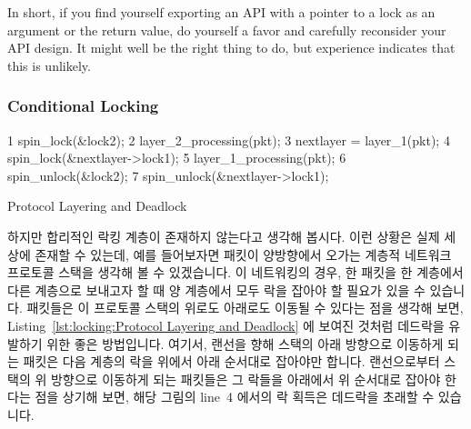 In short, if you find yourself exporting an API with a pointer to a
lock as an argument or the return value, do yourself a favor and carefully
reconsider your API design.
It might well be the right thing to do, but experience indicates that
this is unlikely.
\fi

\subsubsection{Conditional Locking}
\label{sec:locking:Conditional Locking}

\begin{listing}[tbp]
{ \scriptsize
\begin{verbbox}
  1 spin_lock(&lock2);
  2 layer_2_processing(pkt);
  3 nextlayer = layer_1(pkt);
  4 spin_lock(&nextlayer->lock1);
  5 layer_1_processing(pkt);
  6 spin_unlock(&lock2);
  7 spin_unlock(&nextlayer->lock1);
\end{verbbox}
}
\centering
\theverbbox
\caption{Protocol Layering and Deadlock}
\label{lst:locking:Protocol Layering and Deadlock}
\end{listing}

하지만 합리적인 락킹 계층이 존재하지 않는다고 생각해 봅시다.
이런 상황은 실제 세상에 존재할 수 있는데, 예를 들어보자면 패킷이 양방향에서
오가는 계층적 네트워크 프로토콜 스택을 생각해 볼 수 있겠습니다.
이 네트워킹의 경우, 한 패킷을 한 계층에서 다른 계층으로 보내고자 할 때 양
계층에서 모두 락을 잡아야 할 필요가 있을 수 있습니다.
패킷들은 이 프로토콜 스택의 위로도 아래로도 이동될 수 있다는 점을 생각해 보면, 
Listing~\ref{lst:locking:Protocol Layering and Deadlock} 에 보여진 것처럼
데드락을 유발하기 위한 좋은 방법입니다.
여기서, 랜선을 향해 스택의 아래 방향으로 이동하게 되는 패킷은 다음 계층의 락을
위에서 아래 순서대로 잡아야만 합니다.
랜선으로부터 스택의 위 방향으로 이동하게 되는 패킷들은 그 락들을 아래에서 위
순서대로 잡아야 한다는 점을 상기해 보면, 해당 그림의 line~4 에서의 락 획득은
데드락을 초래할 수 있습니다.

